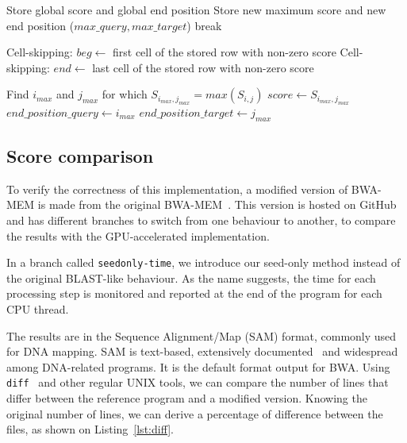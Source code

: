\begin{algorithm}[h!]
\begin{algorithmic}[1]
		
		\EndFor %
		\EndFor %
		\State Store global score and global end position
		\EndIf
		\State Store new maximum score and new end position ($max\_query, max\_target$)
		\State break
		\EndIf
		\EndIf
		
		\State Cell-skipping: $beg \leftarrow$ first cell of the stored row with non-zero score
		\State Cell-skipping: $end \leftarrow$ last cell of the stored row with non-zero score
		\EndFor %
		\EndFor %
		
		\State Find $i_{max}$ and $j_{max}$ for which $S_{i_{max}, j_{max}} = max(S_{i,j})$
		\State $score \leftarrow S_{i_{max}, j_{max}}$
		\State $end\_position\_query \leftarrow i_{max}$
		\State $end\_position\_target \leftarrow j_{max}$
		
		\EndProcedure
		
	\end{algorithmic}
\end{algorithm}


\subsection{Score comparison}

To verify the correctness of this implementation, a modified version of BWA-MEM is made from the original BWA-MEM~\cite{lh3:bwa}. This version is hosted on GitHub~\cite{j-levy:bwa} and has different branches to switch from one behaviour to another, to compare the results with the GPU-accelerated implementation.

In a branch called \verb|seedonly-time|, we introduce our seed-only method instead of the original BLAST-like behaviour. As the name suggests, the time for each processing step is monitored and reported at the end of the program for each CPU thread.

The results are in the Sequence Alignment/Map (SAM) format, commonly used for DNA mapping. SAM is text-based, extensively documented~\cite{samtools:sam} and widespread among DNA-related programs. It is the default format output for BWA. Using \verb|diff|~\cite{misc:gnudiff} and other regular UNIX tools, we can compare the number of lines that differ between the reference program and a modified version. Knowing the original number of lines, we can derive a percentage of difference between the files, as shown on Listing~\ref{lst:diff}.

